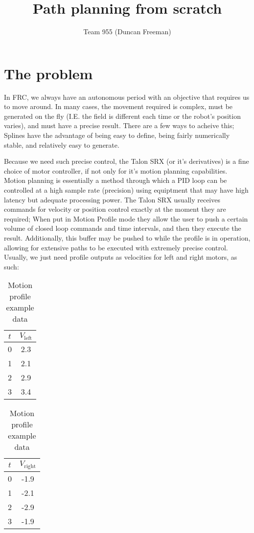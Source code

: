 \documentclass[12pt, english]{article}
\title{ Path planning from scratch }
\author{
	Team 955 (Duncan Freeman)
}
\begin{document}
\maketitle
\tableofcontents
\pagebreak

\section{The problem}
In FRC, we always have an autonomous period with an objective that requires us to move around. In many cases, the movement required is complex, must be generated on the fly (I.E. the field is different each time or the robot's position varies), and must have a precise result. There are a few ways to acheive this; Splines have the advantage of being easy to define, being fairly numerically stable, and relatively easy to generate. 
\par
Because we need such precise control, the Talon SRX (or it's derivatives) is a fine choice of motor controller, if not only for it's motion planning capabilities. Motion planning is essentially a method through which a PID loop can be controlled at a high sample rate (precision) using equiptment that may have high latency but adequate processing power. The Talon SRX usually receives commands for velocity or position control exactly at the moment they are required; When put in Motion Profile mode they allow the user to push a certain volume of closed loop commands and time intervals, and then they execute the result. Additionally, this buffer may be pushed to while the profile is in operation, allowing for extensive paths to be executed with extremely precise control. Usually, we just need profile outputs as velocities for left and right motors, as such:

\begin{table}[h!]
	\begin{center}
		\begin{tabular}{ | c | c | }
			\hline
			$t$ & $V_{\text{left}}$ \\
			\hline
			\hline
			0 & 2.3 \\
			1 & 2.1 \\
			2 & 2.9 \\
			3 & 3.4 \\
		\end{tabular}
		\quad
		\begin{tabular}{ | c | c | }
			\hline
			$t$ & $V_{\text{right}}$ \\
			\hline
			\hline
			0 & -1.9 \\
			1 & -2.1 \\
			2 & -2.9 \\
			3 & -1.9 \\
		\end{tabular}
		\caption{Motion profile example data}
	\end{center}
\end{table}
\end{document}
